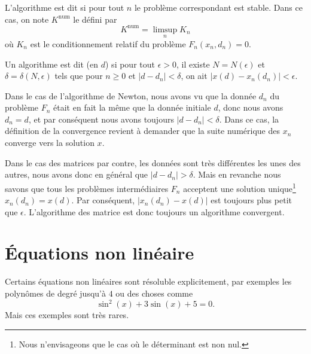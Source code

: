 L'algorithme est dit  si pour tout $n$ le problème correspondant est stable.  Dans ce cas, on note $K^{\mbox{num}}$ le   défini par
\begin{equation}
	K^{\mbox{num}}=\limsup_nK_n
\end{equation}
où $K_n$ est le conditionnement relatif du problème $F_n(x_n,d_n)=0$.

\begin{definition}      \label{DefAlgoConverge}
	Un algorithme est dit  (en $d$) si pour tout $\epsilon>0$, il existe $N=N(\epsilon)$ et $\delta=\delta(N,\epsilon)$ tels que pour $n\geq0$ et $|d-d_n|<\delta$, on ait $|x(d)-x_n(d_n)|<\epsilon$.
\end{definition}

\begin{remark}      \label{RemConvAlgoNewton}
Dans le cas de l'algorithme de Newton, nous avons vu que la donnée $d_n$ du problème $F_n$ était en fait la même que la donnée initiale $d$, donc nous avons $d_n=d$, et par conséquent nous avons toujours $| d-d_n |<\delta$. Dans ce cas, la définition de la convergence revient à demander que la suite numérique des $x_n$ converge vers la solution $x$.
\end{remark}

\begin{remark}
Dans le cas des matrices par contre, les données sont très différentes les unes des autres, nous avons donc en général que $| d-d_n |>\delta$. Mais en revanche nous savons que tous les problèmes intermédiaires $F_n$ acceptent une solution unique\footnote{Nous n'envisageons que le cas où le déterminant est non nul.} $x_n(d_n)=x(d)$. Par conséquent, $| x_n(d_n)-x(d) |$ est toujours plus petit que $\epsilon$. L'algorithme des matrice est donc toujours un algorithme convergent.
\end{remark}

\section{Équations non linéaire}

Certains équations non linéaires sont résoluble explicitement, par exemples les polynômes de degré jusqu'à \( 4\) ou des choses comme
\begin{equation}
	\sin^2(x)+3\sin(x)+5=0.
\end{equation}
Mais ces exemples sont très rares.

